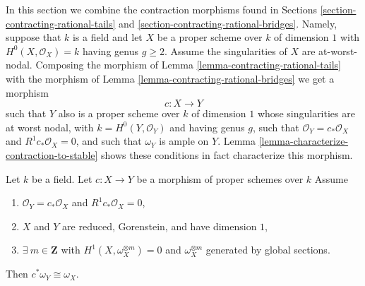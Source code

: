 \noindent
In this section we combine the contraction morphisms found in
Sections \ref{section-contracting-rational-tails} and
\ref{section-contracting-rational-bridges}.
Namely, suppose that $k$ is a field and let $X$ be a proper scheme over $k$
of dimension $1$ with $H^0(X, \mathcal{O}_X) = k$ having genus $g \geq 2$.
Assume the singularities of $X$ are at-worst-nodal. Composing
the morphism of Lemma \ref{lemma-contracting-rational-tails}
with the morphism of Lemma \ref{lemma-contracting-rational-bridges}
we get a morphism
$$
c : X \longrightarrow Y
$$
such that $Y$ also is a proper scheme over $k$ of dimension $1$
whose singularities are at worst nodal, with $k = H^0(Y, \mathcal{O}_Y)$
and having genus $g$, such that
$\mathcal{O}_Y = c_*\mathcal{O}_X$ and $R^1c_*\mathcal{O}_X = 0$,
and such that $\omega_Y$ is ample on $Y$.
Lemma \ref{lemma-characterize-contraction-to-stable}
shows these conditions in fact characterize
this morphism.

\begin{lemma}
\label{lemma-contract-gorenstein-canonical}
Let $k$ be a field. Let $c : X \to Y$ be a morphism of proper schemes over $k$
Assume
\begin{enumerate}
\item $\mathcal{O}_Y = c_*\mathcal{O}_X$ and $R^1c_*\mathcal{O}_X = 0$,
\item $X$ and $Y$ are reduced, Gorenstein, and have dimension $1$,
\item $\exists\ m \in \mathbf{Z}$ with
$H^1(X, \omega_X^{\otimes m}) = 0$ and $\omega_X^{\otimes m}$
generated by global sections.
\end{enumerate}
Then $c^*\omega_Y \cong \omega_X$.
\end{lemma}

